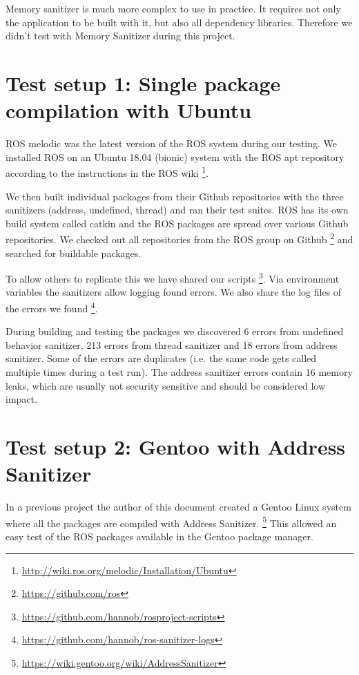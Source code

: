 \documentclass{article}
\begin{document}
Memory sanitizer is much more complex to use in practice. It requires not only the application to be built with
it, but also all dependency libraries. Therefore we didn't test with Memory Sanitizer during this project.

\section{Test setup 1: Single package compilation with Ubuntu}

ROS melodic was the latest version of the ROS system during our testing. We installed ROS on an Ubuntu 18.04
(bionic) system with the ROS apt repository according to the instructions in the ROS wiki
\footnote{\url{http://wiki.ros.org/melodic/Installation/Ubuntu}}.

We then built individual packages from their Github repositories with the three sanitizers
(address, undefined, thread) and ran their test suites. ROS has its
own build system called catkin and the ROS packages are spread over various Github repositories.
We checked out all repositories from the ROS group on Github \footnote{\url{https://github.com/ros}}
and searched for buildable packages.

To allow others to replicate this we have shared our scripts
\footnote{\url{https://github.com/hannob/rosproject-scripts}}. Via environment variables the sanitizers
allow logging found errors. We also share the log files of the errors we found
\footnote{\url{https://github.com/hannob/ros-sanitizer-logs}}.

During building and testing the packages we discovered 6 errors from undefined behavior sanitizer,
213 errors from thread sanitizer and 18 errors from address sanitizer. Some of the errors
are duplicates (i.e. the same code gets called multiple times during a test run). The address sanitizer
errors contain 16 memory leaks, which are usually not security sensitive and should be considered
low impact.

\section{Test setup 2: Gentoo with Address Sanitizer}

In a previous project the author of this document created a Gentoo Linux system where all the
packages are compiled with Address
Sanitizer. \footnote{\url{https://wiki.gentoo.org/wiki/AddressSanitizer}} This allowed an easy test
of the ROS packages available in the Gentoo package manager.
\end{document}
